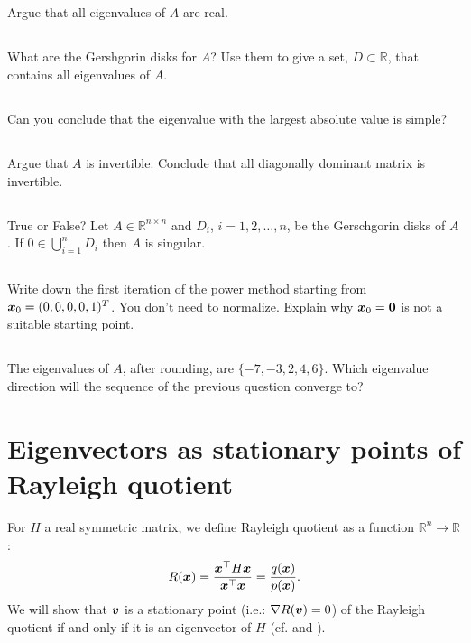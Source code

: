 \documentclass[11pt,letterpaper]{article}
\begin{document}
\subsection{}
Argue that all eigenvalues of $A$ are real.

\subsection{}
What are the Gershgorin disks for $A$?  Use them to give a set, $D \subset \mathbb{R}$, that contains all eigenvalues of $A$.

\subsection{}
Can you conclude that the eigenvalue with the largest absolute value is simple?

\subsection{}
Argue that $A$ is invertible. Conclude that all diagonally dominant matrix is invertible.

\subsection{}
True or False? Let $A \in \mathbb{R}^{n \times n}$ and $D_i$, $i
  = 1,2,\dots,n$, be the Gerschgorin disks of $A$. If $0 \in
  \bigcup_{i=1}^n D_i$ then $A$ is singular.
  
\subsection{}
Write down the first iteration of the power method starting from $\boldsymbol{x}_0 = (0,0,0,0,1)^T$.
You don't need to normalize.
Explain why $\boldsymbol{x}_0 = \boldsymbol{0}$ is not a suitable starting point.

\subsection{}
The eigenvalues of $A$, after rounding, are $\{-7, -3, 2, 4, 6\}$.
Which eigenvalue direction will the sequence of the previous question converge to?

\section{Eigenvectors as stationary points of Rayleigh quotient}
For $H$ a real symmetric matrix, we define Rayleigh quotient as a function $\mathbb{R}^n\to\mathbb{R}$:
\begin{align*}
    R(\boldsymbol{x}) = \frac{\boldsymbol{x}^\top H\boldsymbol{x}}{\boldsymbol{x}^\top \boldsymbol{x}} = \frac{q(\boldsymbol{x})}{p(\boldsymbol{x})}.
\end{align*}
We will show that $\boldsymbol{v}$ is a stationary point (i.e.: $\nabla R(\boldsymbol{v}) = 0$) of the Rayleigh quotient if and only if it is an eigenvector of $H$ (cf. \cite[p.114-116]{Lax_07} and \cite[p.203-204]{TrefethenBau_97}).
\end{document}
